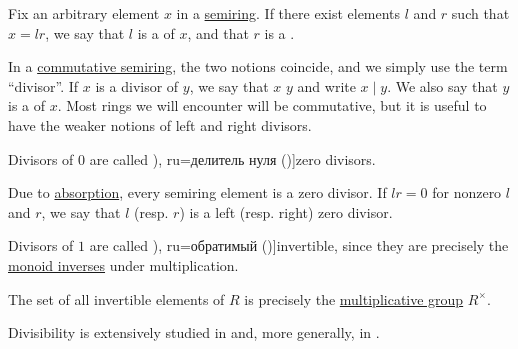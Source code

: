\begin{definition}\label{def:divisibility}
  Fix an arbitrary element \( x \) in a \hyperref[def:semiring]{semiring}. If there exist elements \( l \) and \( r \) such that \( x = lr \), we say that \( l \) is a  of \( x \), and that \( r \) is a .

  In a \hyperref[def:semiring/commutative]{commutative semiring}, the two notions coincide, and we simply use the term \enquote{divisor}. If \( x \) is a divisor of \( y \), we say that \( x \)  \( y \) and write \( x \mid y \). We also say that \( y \) is a  of \( x \). Most rings we will encounter will be commutative, but it is useful to have the weaker notions of left and right divisors.

  \begin{thmenum}
     Divisors of \( 0 \) are called \term[bg=делител на нулата (\cite[def. V.2]{ГеновМиховскиМоллов1991Алгебра}), ru=делитель нуля (\cite[20]{Винберг2014КурсАлгебры})]{zero divisors}.

    Due to \hyperref[def:semiring/absorption]{absorption}, every semiring element is a zero divisor. If \( lr = 0 \) for nonzero \( l \) and \( r \), we say that \( l \) (resp. \( r \)) is a  left (resp. right) zero divisor.

     Divisors of \( 1 \) are called \term[bg=обратим (\cite[def. V.3]{ГеновМиховскиМоллов1991Алгебра}), ru=обратимый (\cite[20]{Винберг2014КурсАлгебры})]{invertible}, since they are precisely the \hyperref[def:monoid_inverse]{monoid inverses} under multiplication.
  \end{thmenum}
\end{definition}
\begin{comments}
  \item The set of all invertible elements of \( R \) is precisely the \hyperref[def:semiring]{multiplicative group} \( R^\times \).
  \item Divisibility is extensively studied in  and, more generally, in .
\end{comments}

